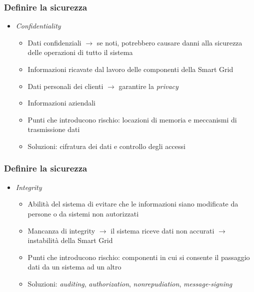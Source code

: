 \begin{frame}
  \frametitle{Definire la sicurezza}
  \begin{itemize}[<+- | alert@+>]
  \item \textit{Confidentiality}
  	\begin{itemize}
  		\item Dati confidenziali $\rightarrow$ se noti, potrebbero causare danni alla sicurezza delle operazioni di tutto il sistema
  		\item Informazioni ricavate dal lavoro delle componenti della Smart Grid
  		\item Dati personali dei clienti $\rightarrow$ garantire la \textit{privacy}
  		\item Informazioni aziendali
  		\item Punti che introducono rischio: locazioni di memoria e meccanismi di trasmissione dati
  		\item Soluzioni: cifratura dei dati e controllo degli accessi
  	\end{itemize}
  \end{itemize}
\end{frame}

\begin{frame}
  \frametitle{Definire la sicurezza}
  \begin{itemize}[<+- | alert@+>]
  \item \textit{Integrity}
  	\begin{itemize}
  	\item Abilità del sistema di evitare che le informazioni siano modificate da persone o da sistemi non autorizzati
  	\item Mancanza di integrity $\rightarrow$ il sistema riceve dati non accurati $\rightarrow$ instabilità della Smart Grid
  	\item Punti che introducono rischio: componenti in cui si consente il passaggio dati da un sistema ad un altro
  	\item Soluzioni: \textit{auditing}, \textit{authorization}, \textit{nonrepudiation}, \textit{message-signing}
  	\end{itemize}
  \end{itemize}
\end{frame}


